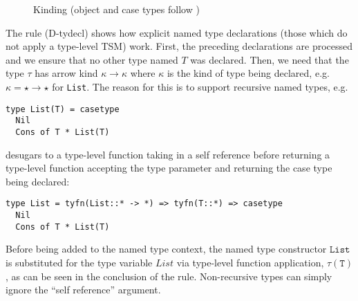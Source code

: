 \documentclass{sig-alternate}
\newcommand{\flyingbox}[1]{\fbox{{#1}}}
\newcommand{\mycaption}[1]{\vspace{-4px}\caption{#1}\vspace{-2px}}
\begin{document}


\begin{figure}[ht]
\flyingbox{$\Delta\vdash_{\Theta}\tau::\kappa$}
\begin{center}
\noLine
\BIC{}
\DP
\end{center}

\begin{center}
\noLine
\BIC{}
\DP
\end{center}
\mycaption{Kinding (object and case types follow \cite{TSLs})}
\label{kinding}
\end{figure}


The rule (D-tydecl) shows how explicit named type declarations (those which do not apply a type-level TSM) work. First, the preceding declarations are processed and we ensure that no other type named $T$ was declared. Then, we need that the type $\tau$ has arrow kind $\kappa \rightarrow \kappa$ where $\kappa$ is the kind of type being declared, e.g. $\kappa = \star \rightarrow \star$ for \verb|List|. The reason for this is to support recursive named types, e.g. 

\begin{lstlisting}[style=wyvern]
type List(T) = casetype
  Nil
  Cons of T * List(T)
\end{lstlisting}
\noindent
desugars to a type-level function taking in a self reference before returning a type-level function accepting the type parameter and returning the case type being declared:

\begin{lstlisting}[style=wyvern]
type List = tyfn(List::* -> *) => tyfn(T::*) => casetype 
  Nil 
  Cons of T * List(T)
\end{lstlisting}

Before being added to the named type context, the named type constructor $\mathtt{List}$ is substituted for the type variable $List$ via type-level function application, $\tau(\mathtt{T})$, as can be seen in the conclusion of the rule. Non-recursive types can simply ignore the ``self reference'' argument.
\end{document}
